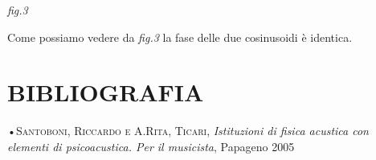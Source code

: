 \documentclass[11pt]{article}
\begin{document}
\begin{multicols*}{2}
\begin{center}
{\scriptsize \emph{fig.3 }}
\end{center}

Come possiamo vedere da \textit {fig.3} la fase delle due cosinusoidi è identica.

\section*{\centering\small{BIBLIOGRAFIA}}
•\textsc{\textsf {Santoboni, Riccardo e A.Rita, Ticari}}, \emph{Istituzioni di fisica acustica con elementi di psicoacustica. Per il musicista}, Papageno 2005\\

\end{multicols*}
\end{document}
